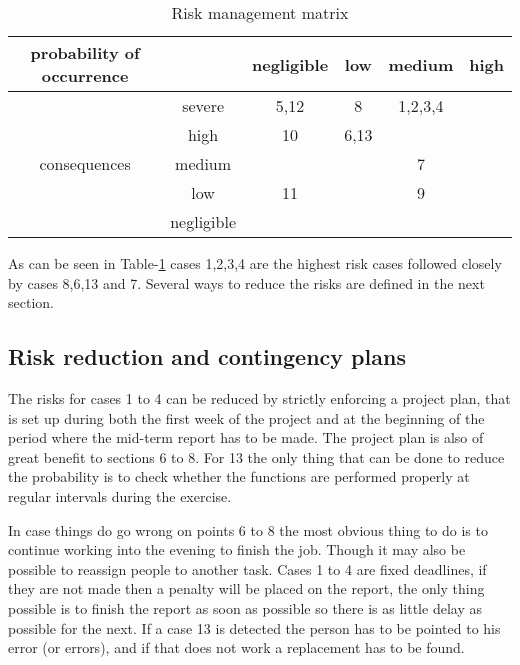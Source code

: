 \begin{table}
	\centering
		\begin{tabular}{c|c||c|c|c|c|}
		probability of occurrence &  & negligible & low & medium & high \\ \hline \hline
		 & severe & 5,12 & 8 & 1,2,3,4 &  \\ \hline
		 & high & 10 & 6,13 &  &  \\ \hline
		consequences & medium & & & 7 & \\ \hline
		 & low & 11 & & 9 & \\ \hline
		 & negligible & & & & \\
		\hline
	\end{tabular}
	\caption{Risk management matrix}
	\label{tab:Riskmanagementmatrix}
\end{table}

As can be seen in Table-\ref{tab:Riskmanagementmatrix} cases 1,2,3,4 are the highest risk cases followed closely by cases 8,6,13 and 7. Several ways to reduce the risks are defined in the next section.

\subsection{Risk reduction and contingency plans}
The risks for cases 1 to 4 can be reduced by strictly enforcing a project plan, that is set up during both the first week of the project and at the beginning of the period where the mid-term report has to be made. The project plan is also of great benefit to sections 6 to 8. For 13 the only thing that can be done to reduce the probability is to check whether the functions are performed properly at regular intervals during the exercise.

In case things do go wrong on points 6 to 8 the most obvious thing to do is to continue working into the evening to finish the job. Though it may also be possible to reassign people to another task. Cases 1 to 4 are fixed deadlines, if they are not made then a penalty will be placed on the report, the only thing possible is to finish the report as soon as possible so there is as little delay as possible for the next. If a case 13 is detected the person has to be pointed to his error (or errors), and if that does not work a replacement has to be found.
